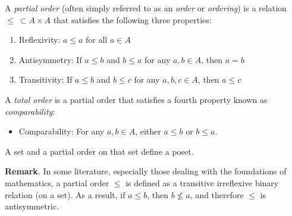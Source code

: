 \documentclass[12pt]{article}
\begin{document}
A \emph{partial order} (often simply referred to as an \emph{order} or \emph{ordering}) is a relation $\leq\:\subset A\times A$ that satisfies the following three properties:

\begin{enumerate}
    \item Reflexivity: $a \leq a$ for all $a\in A$
    \item Antisymmetry: If $a \leq b$ and $b \leq a$ for any $a, b\in A$, then $a = b$
    \item Transitivity: If $a \leq b$ and $b \leq c$ for any $a, b, c\in A$, then $a \leq c$
\end{enumerate}

A \emph{total order} is a partial order that satisfies a fourth property known as \emph{comparability}:

\begin{itemize}
\item Comparability:  For any $a,b\in A$, either $a\leq b$ or $b\leq a$.
\end{itemize}

A set and a partial order on that set define a poset.

\textbf{Remark}.  In some literature, especially those dealing with the foundations of mathematics, a partial order $\le$ is defined as a transitive irreflexive binary relation (on a set).  As a result, if $a\le b$, then $b \nleq a$, and therefore $\le$ is antisymmetric.
\end{document}
